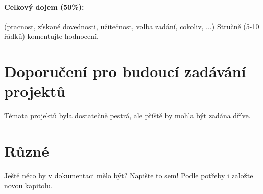 \documentclass[11pt,a4paper]{article}
\begin{document}
\paragraph{Celkový dojem (50\%):} (pracnost, získané dovednosti, užitečnost,
volba zadání, cokoliv, $\ldots$)
Stručně (5-10 řádků) komentujte hodnocení. 

\section{Doporučení pro budoucí zadávání projektů}

Témata projektů byla dostatečně pestrá, ale příště by mohla být zadána dříve.

\section{Různé}

Ještě něco by v dokumentaci mělo být? Napište to sem! Podle potřeby i založte
novou kapitolu.
\end{document}
